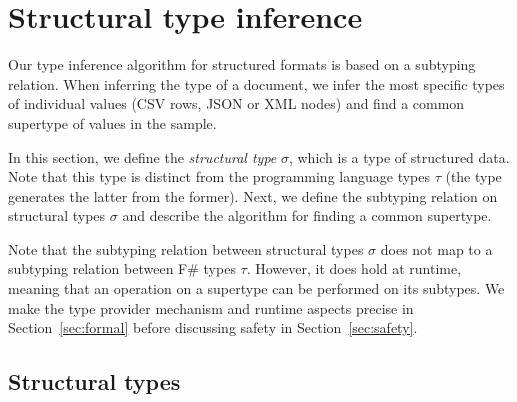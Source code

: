 \documentclass[preprint]{sigplanconf}
\begin{document}
%
%

\section{Structural type inference}
\label{sec:inference}

Our type inference algorithm for structured formats is based on a subtyping relation. When 
inferring the type of a document, we infer the most specific types of individual values (CSV rows,
JSON or XML nodes) and find a common supertype of values in the sample.

In this section, we define the \emph{structural type} $\sigma$, which is a type of structured data.
Note that this type is distinct from the programming language types $\tau$ (the type generates the
latter from the former). Next, we define the subtyping relation on structural types $\sigma$ and 
describe the algorithm for finding a common supertype. 

Note that the subtyping relation between structural types $\sigma$ does not map to a subtyping 
relation between F\#  types $\tau$. However, it does hold at runtime, meaning that an operation on 
a supertype can be performed on its subtypes. We make the type provider mechanism and runtime aspects 
precise in Section~\ref{sec:formal} before discussing safety in Section~\ref{sec:safety}.

\subsection{Structural types}
\label{sec:inference-types}
\end{document}
